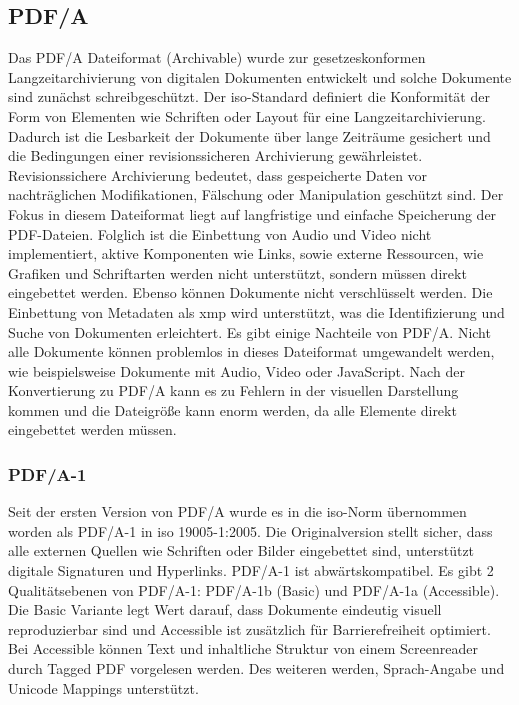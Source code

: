 \subsection{PDF/A}
Das PDF/A Dateiformat (Archivable) wurde zur gesetzeskonformen Langzeitarchivierung von digitalen Dokumenten entwickelt und solche Dokumente sind zunächst schreibgeschützt. Der \gls{iso}-Standard definiert die Konformität der Form von Elementen wie Schriften oder Layout für eine Langzeitarchivierung. Dadurch ist die Lesbarkeit der Dokumente über lange Zeiträume gesichert und die Bedingungen einer revisionssicheren Archivierung gewährleistet. \cite{adobe-pdf-a} Revisionssichere Archivierung bedeutet, dass gespeicherte Daten vor nachträglichen Modifikationen, Fälschung oder Manipulation geschützt sind. \cite{adobe-revisions} Der Fokus in diesem Dateiformat liegt auf langfristige und einfache Speicherung der PDF-Dateien. Folglich ist die Einbettung von Audio und Video nicht implementiert, aktive Komponenten wie Links, sowie externe Ressourcen, wie Grafiken und Schriftarten werden nicht unterstützt, sondern müssen direkt eingebettet werden. Ebenso können Dokumente nicht verschlüsselt werden. Die Einbettung von Metadaten als \gls{xmp} wird unterstützt, was die Identifizierung und Suche von Dokumenten erleichtert. Es gibt einige Nachteile von PDF/A. Nicht alle Dokumente können problemlos in dieses Dateiformat umgewandelt werden, wie beispielsweise Dokumente mit Audio, Video oder JavaScript. Nach der Konvertierung zu PDF/A kann es zu Fehlern in der visuellen Darstellung kommen und die Dateigröße kann enorm werden, da alle Elemente direkt eingebettet werden müssen. \cite{adobe-pdf-a}

\subsubsection{PDF/A-1}
Seit der ersten Version von PDF/A wurde es in die \gls{iso}-Norm übernommen worden als PDF/A-1 in \gls{iso} 19005-1:2005. \cite{proj-consult} Die Originalversion stellt sicher, dass alle externen Quellen wie Schriften oder Bilder eingebettet sind, unterstützt digitale Signaturen und Hyperlinks. PDF/A-1 ist abwärtskompatibel. Es gibt 2 Qualitätsebenen von PDF/A-1: PDF/A-1b (Basic) und PDF/A-1a (Accessible). Die Basic Variante legt Wert darauf, dass Dokumente eindeutig visuell reproduzierbar sind und Accessible ist zusätzlich für Barrierefreiheit optimiert. Bei Accessible können Text und inhaltliche Struktur von einem Screenreader durch Tagged PDF vorgelesen werden. \cite{adobe-pdf-a} Des weiteren werden, Sprach-Angabe und Unicode Mappings unterstützt. \cite{proj-consult}


